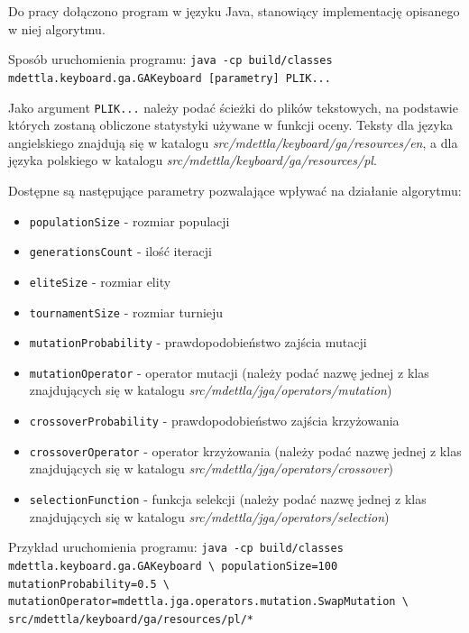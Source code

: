 \documentclass{xmgr}
\begin{document}
Do pracy dołączono program w języku Java, stanowiący implementację opisanego w niej algorytmu.

Sposób uruchomienia programu:\newline
\texttt{java -cp build/classes mdettla.keyboard.ga.GAKeyboard [parametry] PLIK...}

Jako argument \texttt{PLIK...} należy podać ścieżki do plików tekstowych, na podstawie których zostaną obliczone statystyki używane w funkcji oceny. Teksty dla języka angielskiego znajdują się w katalogu \emph{src/mdettla/keyboard/ga/resources/en}, a dla języka polskiego w katalogu \emph{src/mdettla/keyboard/ga/resources/pl}.

Dostępne są następujące parametry pozwalające wpływać na działanie algorytmu:
\begin{itemize}
  \item \texttt{populationSize} - rozmiar populacji
  \item \texttt{generationsCount} - ilość iteracji
  \item \texttt{eliteSize} - rozmiar elity
  \item \texttt{tournamentSize} - rozmiar turnieju
  \item \texttt{mutationProbability} - prawdopodobieństwo zajścia mutacji
  \item \texttt{mutationOperator} - operator mutacji (należy podać nazwę jednej z klas znajdujących się w katalogu \emph{src/mdettla/jga/operators/mutation})
  \item \texttt{crossoverProbability} - prawdopodobieństwo zajścia krzyżowania
  \item \texttt{crossoverOperator} - operator krzyżowania (należy podać nazwę jednej z klas znajdujących się w katalogu \emph{src/mdettla/jga/operators/crossover})
  \item \texttt{selectionFunction} - funkcja selekcji (należy podać nazwę jednej z klas znajdujących się w katalogu \emph{src/mdettla/jga/operators/selection})
\end{itemize}

Przykład uruchomienia programu:\newline
\texttt{java -cp build/classes mdettla.keyboard.ga.GAKeyboard \textbackslash \newline
\indent populationSize=100 mutationProbability=0.5 \textbackslash \newline
\indent mutationOperator=mdettla.jga.operators.mutation.SwapMutation \textbackslash \newline
\indent src/mdettla/keyboard/ga/resources/pl/*}






\listoffigures

\oswiadczenie
\end{document}
